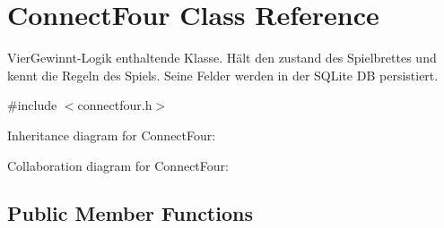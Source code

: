 \hypertarget{class_connect_four}{\section{Connect\-Four Class Reference}
\label{class_connect_four}
}


Vier\-Gewinnt-\/\-Logik enthaltende Klasse. Hält den zustand des Spielbrettes und kennt die Regeln des Spiels. Seine Felder werden in der S\-Q\-Lite D\-B persistiert.  




{\ttfamily \#include $<$connectfour.\-h$>$}



Inheritance diagram for Connect\-Four\-:


Collaboration diagram for Connect\-Four\-:
\subsection*{Public Member Functions}
